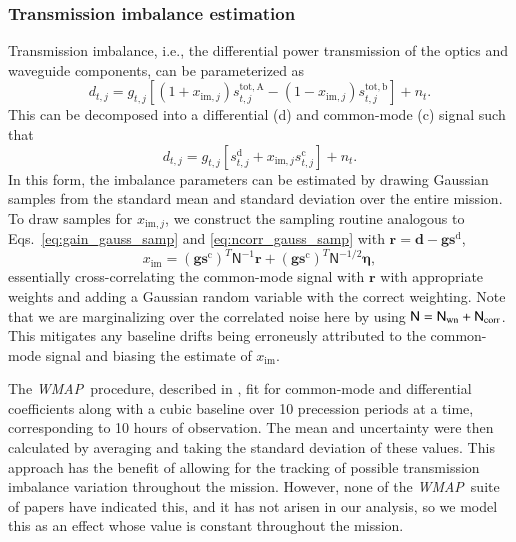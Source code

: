 \documentclass[twocolumn]{../../common/aa}
\def\WMAP{\emph{WMAP}}
\newcommand{\N}[0]{\tens{N}}
\begin{document}
\subsubsection{Transmission imbalance estimation}
\label{ssec:imbalance}


Transmission imbalance, i.e., the differential power transmission of the optics and waveguide components, can be parameterized as
\begin{equation}
	d_{t,j}=g_{t,j}[(1+x_{\mathrm{im},j})s_{t,j}^\mathrm{tot,A}-(1-x_{\mathrm{im},j})s_{t,j}^\mathrm{tot,b}]+n_t.
\end{equation}
This can be decomposed into a differential (d) and common-mode (c) signal such that
\begin{equation}
	d_{t,j}=g_{t,j}[s_{t,j}^\mathrm d+x_{\mathrm{im},j}s_{t,j}^\mathrm c]+n_t.
\end{equation}
In this form, the imbalance parameters can be estimated by drawing Gaussian samples from the standard mean and standard deviation over the entire mission. To draw samples for $x_{\mathrm{im},j}$, we construct the sampling routine analogous to Eqs.~\eqref{eq:gain_gauss_samp} and \eqref{eq:ncorr_gauss_samp} with $\boldsymbol r=\boldsymbol d-\boldsymbol g\boldsymbol s^\mathrm d$,
\begin{equation}
	[(\boldsymbol g\boldsymbol s^\mathrm c)^T\mathsf N^{-1}\boldsymbol g\boldsymbol s^\mathrm c]x_\mathrm{im}
	=(\boldsymbol g\boldsymbol s^\mathrm c)^T\mathsf N^{-1}\boldsymbol r+(\boldsymbol g\boldsymbol s^\mathrm c)^T\mathsf N^{-1/2}\boldsymbol\eta,
\end{equation}
essentially cross-correlating the common-mode signal with $\boldsymbol r$ with appropriate weights and adding a Gaussian random variable with the correct weighting. Note that we are marginalizing over the correlated noise here by using $\N=\N_\mathrm{wn}+\N_\mathrm{corr}$. This mitigates any baseline drifts being erroneusly attributed to the common-mode signal and biasing the estimate of $x_\mathrm{im}$.

The \WMAP\ procedure, described in \citet{jarosik2003a}, fit for common-mode and differential coefficients along with a cubic baseline over 10 precession periods at a time, corresponding to 10 hours of observation. The mean and uncertainty were then calculated by averaging and taking the standard deviation of these values. This approach has the benefit of allowing for the tracking of possible transmission imbalance variation throughout the mission. However, none of the \WMAP\ suite of papers have indicated this, and it has not arisen in our analysis, so we model this as an effect whose value is constant throughout the mission.
\end{document}
